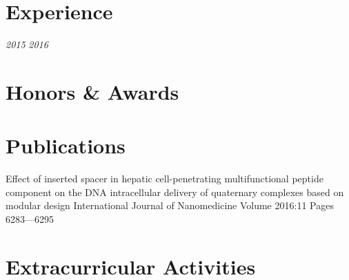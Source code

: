 

\section{Experience}

{
	\textit{2015}
	\textit{2016}
}

\section{ Honors \& Awards }

\section{Publications}

\publicationgroup
{Effect of inserted spacer in hepatic cell-penetrating multifunctional peptide component on the DNA intracellular delivery of quaternary complexes based on modular design}
{ International Journal of Nanomedicine Volume 2016:11 Pages 6283—6295  }



\section{Extracurricular Activities}

